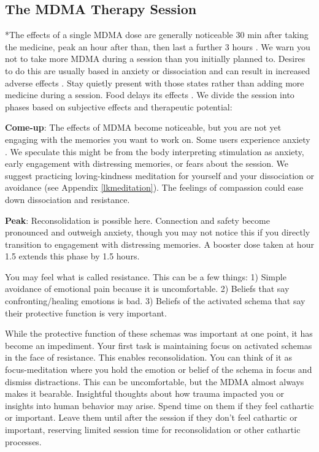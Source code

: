 \documentclass[12pt,letterpaper]{article}
\begin{document}
\subsection{The MDMA Therapy Session}
\label{session}
*The effects of a single MDMA dose are generally noticeable 30 min after taking the medicine, peak an hour after than, then last a further 3 hours \cite{vizeliActuteEffects}. We warn you not to take more MDMA during a session than you initially planned to. Desires to do this are usually based in anxiety or dissociation and can result in increased adverse effects \cite{bruntLinking}. Stay quietly present with those states rather than adding more medicine during a session. Food delays its effects \cite{MithoeferMDMA}. We divide the session into phases based on subjective effects and therapeutic potential:

\textbf{Come-up}:
The effects of MDMA become noticeable, but you are not yet engaging with the memories you want to work on. Some users experience anxiety \cite{hillsSolo}. We speculate this might be from the body interpreting stimulation as anxiety, early engagement with distressing memories, or fears about the session. We suggest practicing loving-kindness meditation for yourself and your dissociation or avoidance (see Appendix \ref{lkmeditation}). The feelings of compassion could ease down dissociation and resistance.

\textbf{Peak}:
Reconsolidation is possible here. Connection and safety become pronounced and outweigh anxiety, though you may not notice this if you directly transition to engagement with distressing memories. A booster dose taken at hour 1.5 extends this phase by 1.5 hours.

You may feel what is called resistance. This can be a few things: 1) Simple avoidance of emotional pain because it is uncomfortable. 2) Beliefs that say confronting/healing emotions is bad. 3) Beliefs of the activated schema that say their protective function is very important. 

While the protective function of these schemas was important at one point, it has become an impediment. Your first task is maintaining focus on activated schemas in the face of resistance. This enables reconsolidation. You can think of it as focus-meditation where you hold the emotion or belief of the schema in focus and dismiss distractions. This can be uncomfortable, but the MDMA almost always makes it bearable. Insightful thoughts about how trauma impacted you or insights into human behavior may arise. Spend time on them if they feel cathartic or important. Leave them until after the session if they don't feel cathartic or important, reserving limited session time for reconsolidation or other cathartic processes. 
\end{document}
